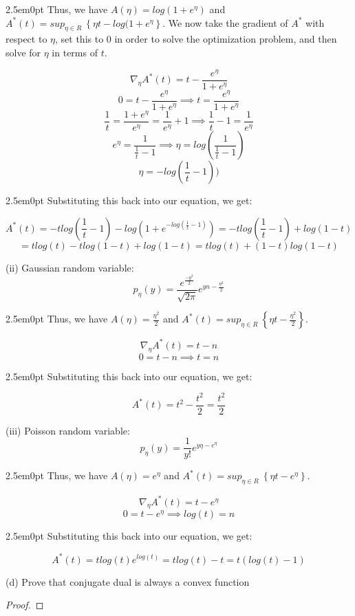 \documentclass[11pt]{article}
\newenvironment{problem}[2][Problem]{\begin{trivlist}
\item[\hskip \labelsep {\bfseries #1}\hskip \labelsep {\bfseries #2.}]}{\end{trivlist}}
\begin{document}
\begin{problem}{2.2}
\begin{adjustwidth}{2.5em}{0pt}
Thus, we have $A(\eta) = log(1+e^{\eta})$ and $A^{*}(t) = sup_{\eta\in R}~ \left\{\eta t - log(1+e^{\eta}\right\}$. We now take the gradient of $A^{*}$ with respect to $\eta$, set this to 0 in order to solve the optimization problem, and then solve for $\eta$ in terms of $t$.
\end{adjustwidth}

\[\nabla_{\eta} A^{*}(t) = t - \frac{e^{\eta}}{1+e^{\eta}} \]
\[0  = t - \frac{e^{\eta}}{1+e^{\eta}} \implies t = \frac{e^{\eta}}{1+e^{\eta}} \]
\[ \frac{1}{t} = \frac{1+e^{\eta}}{e^{\eta}} = \frac{1}{e^{\eta}} + 1 \implies \frac{1}{t} - 1 = \frac{1}{e^{\eta}}\]
\[e^{\eta} = \frac{1}{\frac{1}{t} - 1} \implies \eta = log(\frac{1}{\frac{1}{t} - 1})\]
\[\eta = -log(\frac{1}{t} - 1))\]

\begin{adjustwidth}{2.5em}{0pt}
Substituting this back into our equation, we get:
\end{adjustwidth}

\[A^{*}(t) = -tlog(\frac{1}{t}-1) - log(1+e^{-log(\frac{1}{t}-1)}) = -tlog(\frac{1}{t}-1) + log(1-t)\]
\[= tlog(t) - tlog(1-t) + log(1-t) = tlog(t) + (1-t)log(1-t)\]

(ii) Gaussian random variable:
\\
\[p_{\eta}(y) = \frac{e^{\frac{-y^{2}}{2}}}{\sqrt{2\pi}}e^{yn - \frac{\eta^2}{2}}\]

\begin{adjustwidth}{2.5em}{0pt}
Thus, we have $A(\eta) = \frac{\eta^2}{2}$ and $A^{*}(t) = sup_{\eta\in R}~ \left\{\eta t - \frac{\eta^2}{2}\right\}$. 
\end{adjustwidth}

\[\nabla_{\eta} A^{*}(t) = t - n \]
\[0 = t - n \implies t = n \]

\begin{adjustwidth}{2.5em}{0pt}
Substituting this back into our equation, we get:
\end{adjustwidth}
\[A^{*}(t) = t^2 - \frac{t^2}{2} = \frac{t^2}{2}\]

(iii) Poisson random variable: 
\\
\[p_{\eta}(y) = \frac{1}{y!}e^{y\eta - e^{\eta}} \]

\begin{adjustwidth}{2.5em}{0pt}
Thus, we have $A(\eta) = e^{\eta}$ and $A^{*}(t) = sup_{\eta\in R}~ \left\{\eta t - e^{\eta}\right\}$. 
\end{adjustwidth}

\[\nabla_{\eta} A^{*}(t) = t - e^{\eta} \]
\[0 = t - e^{\eta} \implies log(t) = n \]

\begin{adjustwidth}{2.5em}{0pt}
Substituting this back into our equation, we get:
\end{adjustwidth}
\[A^{*}(t) = tlog(t) e^{log(t)} = tlog(t) - t = t(log(t) - 1)\]

(d) {\color{red} Prove that conjugate dual is always a convex function}

\begin{proof}
\end{proof}

\end{problem}
\end{document}
